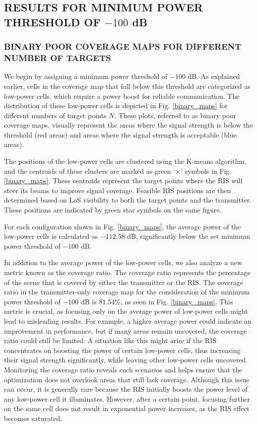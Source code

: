 \documentclass{IEEEoj}
\begin{document}
\subsection{RESULTS FOR MINIMUM POWER THRESHOLD OF $-100$ dB}

\subsubsection{BINARY POOR COVERAGE MAPS FOR DIFFERENT NUMBER OF TARGETS}
We begin by assigning a minimum power threshold of $-100$ dB. As explained earlier, cells in the coverage map that fall below this threshold are categorized as low-power cells, which require a power boost for reliable communication. The distribution of these low-power cells is depicted in Fig. \ref{binary_maps} for different numbers of target points $N$. These plots, referred to as binary poor coverage maps, visually represent the areas where the signal strength is below the threshold (red areas) and areas where the signal strength is acceptable (blue areas).

The positions of the low-power cells are clustered using the K-means algorithm, and the centroids of these clusters are marked as green `$\times$' symbols in Fig. \ref{binary_maps}. These centroids represent the target points where the RIS will steer its beams to improve signal coverage. Feasible RIS positions are then determined based on LoS visibility to both the target points and the transmitter. These positions are indicated by green star symbols on the same figure.

For each configuration shown in Fig. \ref{binary_maps}, the average power of the low-power cells is calculated as $-112.58$ dB, significantly below the set minimum power threshold of $-100$ dB.

In addition to the average power of the low-power cells, we also analyze a new metric known as the coverage ratio. The coverage ratio represents the percentage of the scene that is covered by either the transmitter or the RIS. The coverage ratio in the transmitter-only coverage map for the consideration of the minimum power threshold of $-100$ dB is $81.54\%$, as seen in Fig. \ref{binary_maps}. This metric is crucial, as focusing only on the average power of low-power cells might lead to misleading results. For example, a higher average power could indicate an improvement in performance, but if many areas remain uncovered, the coverage ratio could still be limited. A situation like this might arise if the RIS concentrates on boosting the power of certain low-power cells, thus increasing their signal strength significantly, while leaving other low-power cells uncovered. Monitoring the coverage ratio reveals such scenarios and helps ensure that the optimization does not overlook areas that still lack coverage. Although this issue can occur, it is generally rare because the RIS initially boosts the power level of any low-power cell it illuminates. However, after a certain point, focusing further on the same cell does not result in exponential power increases, as the RIS effect becomes saturated.
\end{document}
